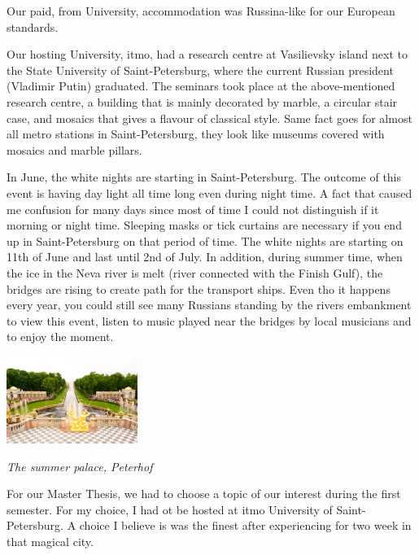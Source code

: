 \documentclass[10pt,a4paper]{article} %
\begin{document}
\begin{multicols}{3}
Our paid, from University, accommodation was Russina-like for our European 
standards.


Our hosting University, {\sc itmo}, had a research centre at Vasilievsky island 
next to the State University of Saint-Petersburg, where the current Russian 
president (Vladimir Putin) graduated. 
The seminars took place at the above-mentioned research centre, a building that 
is mainly decorated by marble, a circular stair case, 
and mosaics that gives a flavour of classical style. 
Same fact goes for almost all metro stations in Saint-Petersburg, they look like 
museums covered with mosaics and marble pillars. 

 
In June, the white nights are starting in Saint-Petersburg. 
The outcome of this event is having day light all time long even during night 
time. 
A fact that caused me confusion for many days since most of time I could not 
distinguish if it morning or night time. 
Sleeping masks or tick curtains are necessary if you end up in Saint-Petersburg 
on that period of time. 
The white nights are starting on 11th of June and last until 2nd of July.
In addition, during summer time, when the ice in the Neva river is melt (river 
connected with the Finish Gulf), the bridges are rising to create path for the 
transport ships. 
Even tho it happens every year, you could still see many Russians standing by the 
rivers embankment to view this event, listen to music played near the bridges by 
local musicians and to enjoy the moment.
 
 
\begin{center}
	\includegraphics[width=0.32\textwidth]{media/petergof.jpg}
	\par\textit{The summer palace, Peterhof}
\end{center}


For our Master Thesis, we had to choose a topic of our interest during the first 
semester. 
For my choice, I had ot be hosted at {\sc itmo} University of Saint-Petersburg. 
A choice I believe is was the finest after experiencing for two week in that 
magical city.



\end{multicols}
\end{document}

